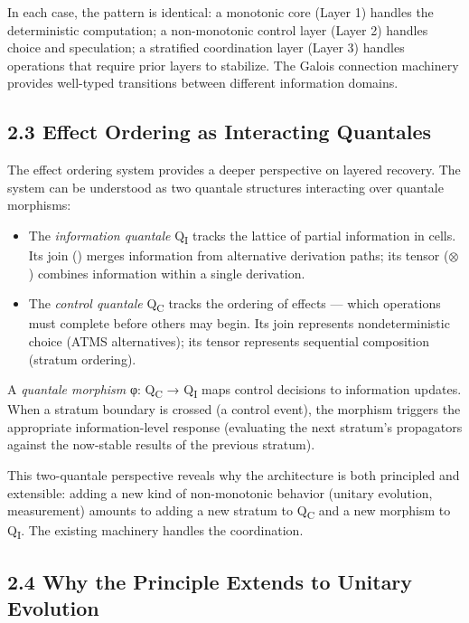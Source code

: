 \documentclass[11pt]{article}
\begin{document}
In each case, the pattern is identical: a monotonic core (Layer 1) handles the
deterministic computation; a non-monotonic control layer (Layer 2) handles choice
and speculation; a stratified coordination layer (Layer 3) handles operations that
require prior layers to stabilize. The Galois connection machinery provides
well-typed transitions between different information domains.
\subsection{2.3 Effect Ordering as Interacting Quantales}
\label{sec:org915ab6b}

The effect ordering system provides a deeper perspective on layered recovery.
The system can be understood as two quantale structures interacting over quantale
morphisms:

\begin{itemize}
\item The \emph{information quantale} Q\textsubscript{I} tracks the lattice of partial information in
cells. Its join (\bigvee) merges information from alternative derivation paths;
its tensor (\(\otimes\)) combines information within a single derivation.
\item The \emph{control quantale} Q\textsubscript{C} tracks the ordering of effects --- which operations
must complete before others may begin. Its join represents nondeterministic
choice (ATMS alternatives); its tensor represents sequential composition
(stratum ordering).
\end{itemize}

A \emph{quantale morphism} φ: Q\textsubscript{C} → Q\textsubscript{I} maps control decisions to information updates.
When a stratum boundary is crossed (a control event), the morphism triggers the
appropriate information-level response (evaluating the next stratum's propagators
against the now-stable results of the previous stratum).

This two-quantale perspective reveals why the architecture is both principled and
extensible: adding a new kind of non-monotonic behavior (unitary evolution,
measurement) amounts to adding a new stratum to Q\textsubscript{C} and a new morphism to Q\textsubscript{I}.
The existing machinery handles the coordination.
\subsection{2.4 Why the Principle Extends to Unitary Evolution}
\label{sec:org9adf7a0}
\end{document}
